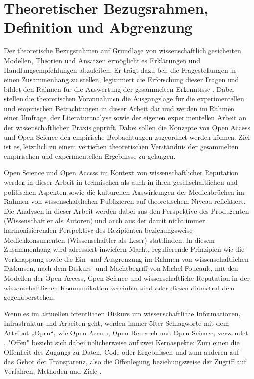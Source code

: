 \chapter{Theoretischer Bezugsrahmen, Definition und Abgrenzung } 

Der theoretische Bezugsrahmen auf Grundlage von wissenschaftlich gesicherten Modellen, Theorien und Ansätzen ermöglicht es Erklärungen und Handlungsempfehlungen abzuleiten\cite{martin_2007_wissenschaftstheorie}. Er trägt dazu bei, die Fragestellungen in einen Zusammenhang zu stellen, legitimiert die Erforschung dieser Fragen und bildet den Rahmen für die Auswertung der gesammelten Erkenntisse \cite{suchen}. Dabei stellen die theoretischen Vorannahmen die Ausgangslage für die experimentellen und empirischen Betrachtungen in dieser Arbeit dar und werden im Rahmen einer Umfrage, der Literaturanalyse sowie der eigenen experimentellen Arbeit an der wissenschaftlichen Praxis geprüft. Dabei sollen die Konzepte von Open Access und Open Science den empirische Beobachtungen zugeordnet werden können. Ziel ist es, letztlich zu einem vertieften theoretischen Verständnis der gesammelten empirischen und experimentellen Ergebnisse zu gelangen. 

Open Science und Open Access im Kontext von wissenschaftlicher Reputation werden in dieser Arbeit in technischen als auch in ihren gesellschaftlichen und politischen Aspekten sowie die kulturellen Auswirkungen der Medienbrüchen im Rahmen von wissenschaftlichen Publizieren auf theoretischem Niveau reflektiert. Die Analysen in dieser Arbeit werden dabei aus den Perspektive des Produzenten (Wissenschaftler als Autoren) und auch aus der damit nicht immer harmonisierenden Perspektive des Rezipienten beziehungsweise Medienkonsumenten (Wissenschaftler als Leser) stattfinden. In diesem Zusammenhang wird adressiert inwiefern Macht, regulierende Prinzipien wie die Verknappung sowie die Ein- und Ausgrenzung im Rahmen von wissenschaftlichen Diskursen, nach dem Diskurs- und Machtbegriff von Michel Foucault, mit den Modellen der Open Access, Open Science und wissenschaftliche Reputation in der wissenschaftlichen Kommunikation vereinbar sind oder diesen diametral dem gegenüberstehen. 

Wenn es im aktuellen öffentlichen Diskurs um wissenschaftliche Informationen, Infrastruktur und Arbeiten geht, werden immer öfter Schlagworte mit dem Attribut „Open“, wie Open Access, Open Research und Open Science, verwendet \cite{bunz_2014} \cite{schulze_2013_open}. "Offen" bezieht sich dabei üblicherweise auf zwei Kernaspekte: Zum einen die Offenheit des Zugangs zu Daten, Code oder Ergebnissen und zum anderen auf das Gebot der Transparenz, also die Offenlegung beziehungsweise der Zugriff auf Verfahren, Methoden und Ziele \cite{schulze_2013_open}.

